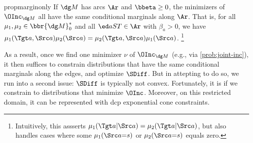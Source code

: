 
\begin{linked}{prop}{marginonly}
    If $\dg M$ has arcs $\Ar$ and $\bbeta \ge 0$,
    the minimizers of $\OInc_{\dg M}$ all have the same conditional
        marginals along $\Ar$.
    That is, for all $\mu_1, \mu_2 \in \bbr{\dg M}_0^*$
    and all $\ed aST \in \Ar$ 
    with $\beta_a > 0$, we have
    {\subafalse
    $\mu_1(\Tgt a, \Src a)\mu_2(\Src a) = \mu_2(\Tgt a, \Src a) \mu_1(\Src a)$.%
    \footnote{ 
        Intuitively, this assserts 
        $\mu_1(\Tgt a | \Src a) = \mu_2(\Tgt a | \Src a)$,
        but also 
        handles cases where some
        $\mu_1(\Src a {=} s)$ or $\mu_2(\Src a {=} s)$ 
        equals zero.
    }}
\end{linked}

As a result, once we find one minimizer $\nu$ of $\OInc_{\dg M}$
(e.g., via \eqref{prob:joint-inc}),
it then suffices to constrain distributions that have the same
conditional marginals along the edges, and optimize $\SDiff$.
But in attepting to do so, we run into a second issue: $\SDiff$
is typically not convex.
Fortunately, it is if we constrain to distributions that minimize $\OInc$.
Moreover, on this restricted domain, it can be represented 
with dcp exponential cone constraints.

